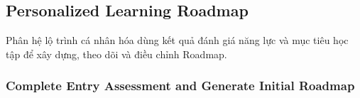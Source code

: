 \documentclass[12pt,a4paper,oneside]{report}
\begin{document}

\subsection{Personalized Learning Roadmap}
\label{subsec:personalized-learning-roadmap}

Phân hệ lộ trình cá nhân hóa dùng kết quả đánh giá năng lực và mục tiêu học tập để xây dựng, theo dõi và điều chỉnh Roadmap.

\subsubsection{Complete Entry Assessment and Generate Initial Roadmap}
\label{subsubsec:generate-initial-roadmap}
\end{document}
